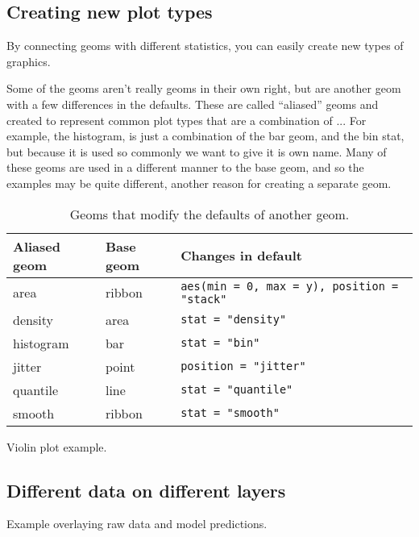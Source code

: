 \subsection{Creating new plot types}
\label{sub:new_plot_types}

By connecting geoms with different statistics, you can easily create new types of graphics.  

Some of the geoms aren't really geoms in their own right, but are another geom with a few differences in the defaults.  These are called ``aliased'' geoms and created to represent common plot types that are a combination of ...  For example, the histogram, is just a combination of the bar geom, and the bin stat, but because it is used so commonly we want to give it is own name. Many of these geoms are used in a different manner to the base geom, and so the examples may be quite different, another reason for creating a separate geom.

\begin{table}
  \begin{center}
  \begin{tabular}{lll}
    \toprule
    Aliased geom & Base geom & Changes in default \\
    \midrule
    area      & ribbon & \verb!aes(min = 0, max = y), position = "stack"!  \\
    density   & area   & \verb!stat = "density"!    \\
    histogram & bar    & \verb!stat = "bin"!        \\
    jitter    & point  & \verb!position = "jitter"! \\
    quantile  & line   & \verb!stat = "quantile"!   \\
    smooth    & ribbon & \verb!stat = "smooth"!     \\
    \bottomrule
  \end{tabular}
  \end{center}
  \caption{Geoms that modify the defaults of another geom.}
  \label{label}
\end{table}

Violin plot example.

\subsection{Different data on different layers}
\label{sub:different_data_on_different_layers}

Example overlaying raw data and model predictions.



